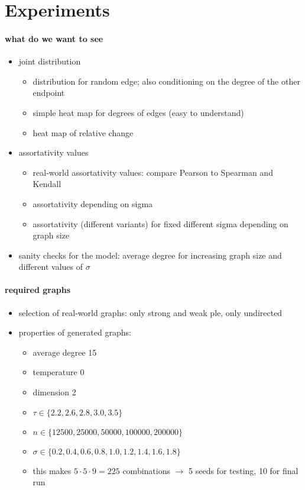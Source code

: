 \documentclass[a4paper,11pt]{article}
\begin{document}
\allsectionsfont{\sffamily}

\section{Experiments}
\label{sec:experiments}

\paragraph{what do we want to see}

\begin{itemize}
\item joint distribution
  \begin{itemize}
  \item distribution for random edge; also conditioning on the degree
    of the other endpoint
  \item simple heat map for degrees of edges (easy to understand)
  \item heat map of relative change
  \end{itemize}
\item assortativity values
  \begin{itemize}
  \item real-world assortativity values: compare Pearson to Spearman
    and Kendall
  \item assortativity depending on sigma
  \item assortativity (different variants) for fixed different sigma
    depending on graph size
  \end{itemize}
\item sanity checks for the model: average degree for increasing graph
  size and different values of $\sigma$
\end{itemize}

\paragraph{required graphs}

\begin{itemize}
\item selection of real-world graphs: only strong and weak ple, only
  undirected
\item properties of generated graphs:
  \begin{itemize}
  \item average degree 15
  \item temperature 0
  \item dimension 2
  \item $\tau \in \{2.2, 2.6, 2.8, 3.0, 3.5\}$
  \item $n \in \{12500, 25000, 50000, 100000, 200000\}$
  \item $\sigma \in \{0.2, 0.4, 0.6, 0.8, 1.0, 1.2, 1.4, 1.6, 1.8\}$
  \item this makes $5 \cdot 5 \cdot 9 = 225$ combinations
    $\rightarrow$ 5 seeds for testing, 10 for final run
  \end{itemize}
\end{itemize}
\end{document}

